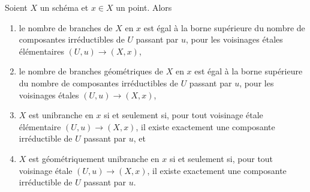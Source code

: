 \begin{lemma}
\label{lemma-nr-branches}
Soient $X$ un schéma et $x \in X$ un point. Alors
\begin{enumerate}
\item le nombre de branches de $X$ en $x$ est égal à
la borne supérieure du nombre de composantes irréductibles de $U$
passant par $u$, pour les voisinages \'etales élémentaires
$(U, u) \to (X, x)$,
\item le nombre de branches géométriques de $X$ en $x$ est égal à
la borne supérieure du nombre de composantes irréductibles de $U$
passant par $u$, pour les voisinages \'etales
$(U, u) \to (X, x)$,
\item $X$ est unibranche en $x$ si et seulement si, pour tout
voisinage \'etale élémentaire $(U, u) \to (X, x)$, il existe
exactement une composante irréductible de $U$ passant par $u$, et
\item $X$ est géométriquement unibranche en $x$ si et seulement si, pour tout
voisinage \'etale $(U, u) \to (X, x)$, il existe
exactement une composante irréductible de $U$ passant par $u$.
\end{enumerate}
\end{lemma}

